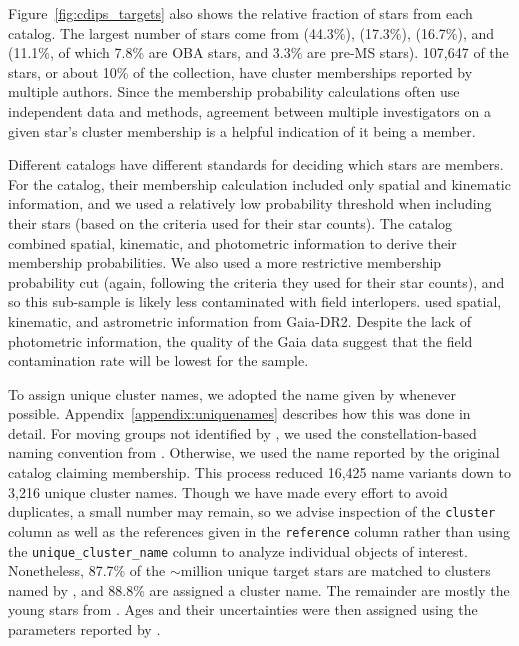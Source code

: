 \documentclass[12pt,twocolumn,tighten]{aastex62}
\begin{document}
Figure~\ref{fig:cdips_targets} also shows the relative fraction of
stars from each catalog.  The largest number of stars come from
\citealt{dias_proper_2014} (44.3\%), \citealt{Kharchenko_et_al_2013}
(17.3\%), \citealt{cantat-gaudin_gaia_2018} (16.7\%), and
\citealt{zari_3d_2018} (11.1\%, of which 7.8\% are OBA stars, and
3.3\% are pre-MS stars).  107{,}647 of the stars, or about 10\% of the
collection, have cluster memberships reported by multiple authors.
Since the membership probability calculations often use independent
data and methods, agreement between multiple investigators on a given
star's cluster membership is a helpful indication of it being a
member.

Different catalogs have different standards for deciding which stars
are members.  For the \citet{dias_proper_2014} catalog, their
membership calculation included only spatial and kinematic
information, and we used a relatively low probability threshold when
including their stars (based on the criteria
\citealt{dias_proper_2014} used for their star counts).  The
\citet{Kharchenko_et_al_2013} catalog combined spatial, kinematic, and
photometric information to derive their membership probabilities.  We
also used a more restrictive membership probability cut (again,
following the criteria they used for their star counts), and so this
sub-sample is likely less contaminated with field interlopers.
\citet{cantat-gaudin_gaia_2018} used spatial, kinematic, and
astrometric information from Gaia-DR2. Despite the lack of photometric
information, the quality of the Gaia data suggest that the field
contamination rate will be lowest for the
\citet{cantat-gaudin_gaia_2018} sample.

To assign unique cluster names, we adopted the name given by
\citet{Kharchenko_et_al_2013} whenever possible.
Appendix~\ref{appendix:uniquenames} describes  how this was done in
detail.  For moving groups not identified by
\citet{Kharchenko_et_al_2013}, we used the constellation-based naming
convention from \citet{gagne_banyan_XI_2018}.  Otherwise, we used the
name reported by the original catalog claiming membership.  This
process reduced 16,425 name variants down to 3,216 unique cluster
names.  Though we have made every effort to avoid duplicates, a small
number may remain, so we advise inspection of the \texttt{cluster}
column as well as the references given in the \texttt{reference}
column rather than using the \texttt{unique\_cluster\_name} column to
analyze individual objects of interest.  Nonetheless, 87.7\% of the
$\sim$million unique target stars are matched to clusters named by
\citet{Kharchenko_et_al_2013}, and 88.8\% are assigned a cluster name.
The remainder are mostly the young stars from \citet{zari_3d_2018}.
Ages and their uncertainties were then assigned using the parameters
reported by \citet{Kharchenko_et_al_2013}.
\end{document}
